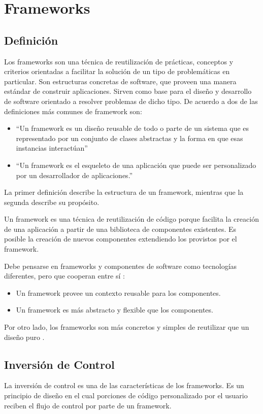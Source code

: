 
\section{Frameworks}


\subsection{Definición}

Los frameworks son una técnica de reutilización de prácticas, conceptos y
criterios orientadas a facilitar la solución de un tipo de problemáticas en
particular. Son estructuras concretas de software, que proveen una manera
estándar de construir aplicaciones. Sirven como base para el diseño y
desarrollo de software orientado a resolver problemas de dicho tipo.
De acuerdo a \cite{Johnson97} dos de las definiciones más comunes de framework
son:
\begin{itemize}
  \item ``Un framework es un diseño reusable de todo o parte de un sistema que es
  representado por un conjunto de clases abstractas y la forma en que esas
  instancias interactúan''
  \item ``Un framework es el esqueleto de una aplicación que puede ser
  personalizado por un desarrollador de aplicaciones.''
\end{itemize} 

 La primer definición describe la estructura de un framework, mientras que la
 segunda describe su propósito. 

Un framework es una técnica de reutilización de código porque facilita la
creación de una aplicación a partir de una biblioteca de componentes existentes.
Es posible la creación de nuevos componentes extendiendo los provistos por el
framework.

Debe pensarse en frameworks y componentes de software como tecnologías
diferentes, pero que cooperan entre sí \cite{JohnsonFeb97}:
\begin{itemize}
  \item Un framework provee un contexto reusable para los componentes.
  \item Un framework es más abstracto y flexible que los componentes.
\end{itemize} 

Por otro lado, los frameworks son más concretos y simples de reutilizar
que un diseño puro \cite{JohnsonFeb97}.

\subsection{Inversión de Control}
\label{sec:inversion_control}
La inversión de control es una de las características de los frameworks.
Es un principio de diseño en el cual porciones de código personalizado por el
usuario reciben el flujo de control por parte de un framework.

